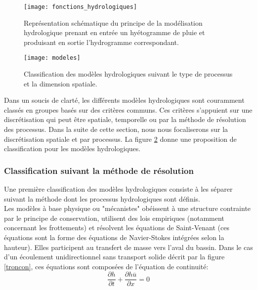 \begin{figure}[h!]
 \centerline{\texttt{[image: fonctions\_hydrologiques]}}
 \caption{Représentation schématique du principe de la modélisation hydrologique prenant en entrée un hyétogramme de pluie et produisant en sortie l'hydrogramme correspondant.}
  \label{fonction-hydro}
\end{figure}

\begin{figure}[h!]
 \centerline{\texttt{[image: modeles]}}
 \caption{Classification des modèles hydrologiques suivant le type de processus et la dimension spatiale.}
  \label{modele}
\end{figure}
\clearpage

\noindent Dans un soucis de clarté, les différents modèles hydrologiques sont couramment classés en groupes basés sur des critères communs. Ces critères s'appuient sur une discrétisation qui peut être spatiale, temporelle ou par la méthode de résolution des processus. Dans la suite de cette section, nous nous focaliserons sur la discrétisation spatiale et par processus.
La figure \ref{modele} donne une proposition de classification pour les modèles hydrologiques.


\subsubsection{{\selectfont Classification suivant la méthode de résolution}}

Une première classification des modèles hydrologiques consiste à les séparer suivant la méthode dont les processus hydrologiques sont définis.\\

Les modèles à base physique ou "mécanistes" obéissent à une structure contrainte par le principe de conservation, utilisent des lois empiriques (notamment concernant les frottements) et résolvent les équations de Saint-Venant (ces équations sont la forme des équations de Navier-Stokes intégrées selon la hauteur). Elles participent au transfert de masse vers l'aval du bassin. Dans le cas d'un écoulement unidirectionnel sans transport solide décrit par la figure \ref{troncon}, ces équations sont composées de l'équation de continuité: \\
\begin{equation}
\frac{\partial h}{\partial t} + \frac{\partial h \overline{u}}{\partial x}=0
\end{equation}

